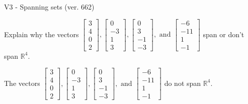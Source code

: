 \begin{exercise}
  \begin{exerciseTitle}V3 - Spanning sets (ver. 662)\end{exerciseTitle}
  \begin{exerciseStatement}
    Explain why the vectors \(\left[\begin{array}{r}
3 \\
4 \\
0 \\
2
\end{array}\right] , \left[\begin{array}{r}
0 \\
-3 \\
1 \\
3
\end{array}\right] , \left[\begin{array}{r}
0 \\
3 \\
-1 \\
-3
\end{array}\right] , \text{ and } \left[\begin{array}{r}
-6 \\
-11 \\
1 \\
-1
\end{array}\right]\) span or don't span \(\mathbb{R}^4\). 
	


  \end{exerciseStatement}
  \begin{exerciseAnswer}
   The vectors \(\left[\begin{array}{r}
3 \\
4 \\
0 \\
2
\end{array}\right] , \left[\begin{array}{r}
0 \\
-3 \\
1 \\
3
\end{array}\right] , \left[\begin{array}{r}
0 \\
3 \\
-1 \\
-3
\end{array}\right] , \text{ and } \left[\begin{array}{r}
-6 \\
-11 \\
1 \\
-1
\end{array}\right]\) 
  	 do not  
	span \(\mathbb{R}^4\).
  


  \end{exerciseAnswer}
\end{exercise}